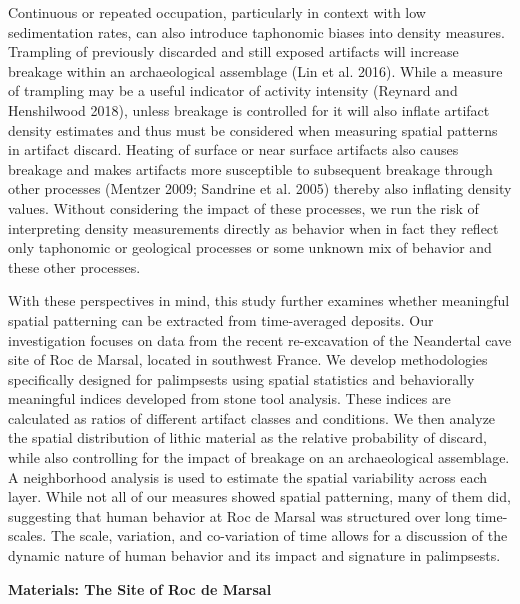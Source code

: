 \documentclass[smallextended]{svjour3}       %
\begin{document}
Continuous or repeated occupation, particularly in context with low
sedimentation rates, can also introduce taphonomic biases into density
measures. Trampling of previously discarded and still exposed artifacts
will increase breakage within an archaeological assemblage (Lin et al.
2016). While a measure of trampling may be a useful indicator of
activity intensity (Reynard and Henshilwood 2018), unless breakage is
controlled for it will also inflate artifact density estimates and thus
must be considered when measuring spatial patterns in artifact discard.
Heating of surface or near surface artifacts also causes breakage and
makes artifacts more susceptible to subsequent breakage through other
processes (Mentzer 2009; Sandrine et al. 2005) thereby also inflating
density values. Without considering the impact of these processes, we
run the risk of interpreting density measurements directly as behavior
when in fact they reflect only taphonomic or geological processes or
some unknown mix of behavior and these other processes.

With these perspectives in mind, this study further examines whether
meaningful spatial patterning can be extracted from time-averaged
deposits. Our investigation focuses on data from the recent
re-excavation of the Neandertal cave site of Roc de Marsal, located in
southwest France. We develop methodologies specifically designed for
palimpsests using spatial statistics and behaviorally meaningful indices
developed from stone tool analysis. These indices are calculated as
ratios of different artifact classes and conditions. We then analyze the
spatial distribution of lithic material as the relative probability of
discard, while also controlling for the impact of breakage on an
archaeological assemblage. A neighborhood analysis is used to estimate
the spatial variability across each layer. While not all of our measures
showed spatial patterning, many of them did, suggesting that human
behavior at Roc de Marsal was structured over long time-scales. The
scale, variation, and co-variation of time allows for a discussion of
the dynamic nature of human behavior and its impact and signature in
palimpsests.

\textbf{Materials: The Site of Roc de Marsal}
\end{document}

